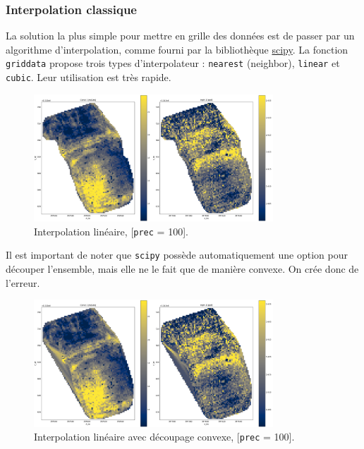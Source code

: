 \documentclass[12pt]{article}
\begin{document}
\newpage
\subsubsection{Interpolation classique}

    La solution la plus simple pour mettre en grille des données est de passer par un algorithme d'interpolation, comme fourni par la bibliothèque \href{https://docs.scipy.org/doc/scipy/reference/generated/scipy.interpolate.griddata.html}{scipy}. La fonction \texttt{griddata} propose trois types d'interpolateur : \texttt{nearest} (neighbor), \texttt{linear} et \texttt{cubic}. Leur utilisation est très rapide.

    \begin{figure}[ht!]
        \centering
        \includegraphics[width=0.8\textwidth]{Images/Grid_Interplin_r1c1p100.png}
        \caption{Interpolation linéaire, [\texttt{prec} = 100].}
    \end{figure}

    Il est important de noter que \texttt{scipy} possède automatiquement une option pour découper l'ensemble, mais elle ne le fait que de manière convexe. On crée donc de l'erreur.

    \begin{figure}[ht!]
        \centering
        \includegraphics[width=0.8\textwidth]{Images/Grid_Interplin_r1c1p100_nocrop.png}
        \caption{Interpolation linéaire avec découpage convexe, [\texttt{prec} = 100].}
    \end{figure}
\end{document}
